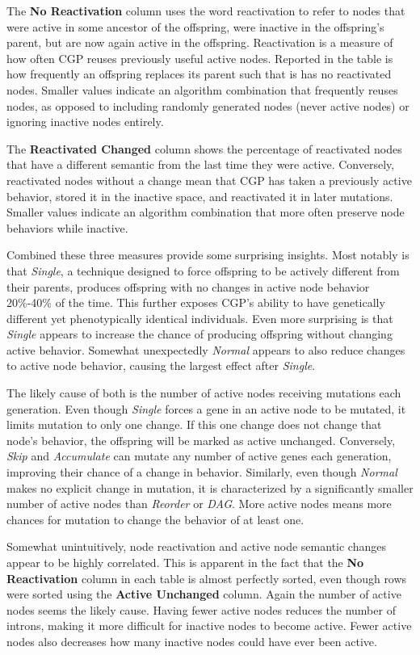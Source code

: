 \documentclass[journal]{IEEEtran}
\begin{document}
The \textbf{No Reactivation} column uses the word reactivation to refer to nodes
that were active in some ancestor of the offspring, were inactive in the offspring's
parent, but are now again active in the offspring.  Reactivation is a measure of how
often CGP reuses previously useful active nodes.  Reported in the table is how
frequently an offspring replaces its parent such that is has no reactivated nodes.  Smaller
values indicate an algorithm combination that frequently reuses nodes, as opposed to
including randomly generated nodes (never active nodes) or ignoring inactive nodes
entirely.

The \textbf{Reactivated Changed} column shows the percentage of reactivated nodes
that have a different semantic from the last time they were active.  Conversely,
reactivated nodes without a change mean that CGP has taken a previously active behavior,
stored it in the inactive space, and reactivated it in later mutations.  Smaller values
indicate an algorithm combination that more often preserve node behaviors while
inactive.

Combined these three measures provide some surprising insights.  Most notably
is that \emph{Single}, a technique designed to force offspring to be actively different
from their parents, produces offspring with no changes in active node behavior
20\%-40\% of the time.  This further exposes CGP's ability to have genetically different
yet phenotypically identical individuals.  Even more surprising is that \emph{Single}
appears to increase the chance of producing offspring without changing active behavior.
Somewhat unexpectedly \emph{Normal} appears to also reduce changes to active node behavior,
causing the largest effect after \emph{Single}.

The likely cause of both is the number
of active nodes receiving mutations each generation.  Even though \emph{Single}
forces a gene in an active node to be mutated, it limits mutation to only one change.
If this one change does not change that node's behavior, the offspring will be marked
as active unchanged.  Conversely, \emph{Skip} and \emph{Accumulate} can mutate any
number of active genes each generation, improving their chance of a change in behavior.
Similarly, even though \emph{Normal} makes no explicit change in mutation, it is characterized
by a significantly smaller number of active nodes than \emph{Reorder} or \emph{DAG}.  More
active nodes means more chances for mutation to change the behavior of at least one.

Somewhat unintuitively, node reactivation and active node semantic changes appear
to be highly correlated.  This is apparent in the fact that the \textbf{No Reactivation}
column in each table is almost perfectly sorted, even though rows were sorted using the
\textbf{Active Unchanged} column.  Again the number of active nodes seems the likely
cause.  Having fewer active nodes reduces the number of introns, making it more
difficult for inactive nodes to become active.  Fewer active nodes also decreases
how many inactive nodes could have ever been active.
\end{document}
